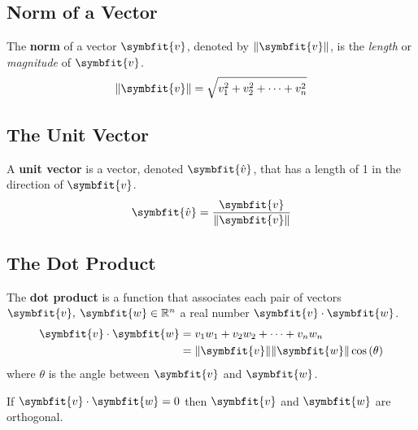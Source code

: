 \documentclass{article}
\begin{document}
\subsection{Norm of a Vector}
\begin{definition}
    The \textbf{norm} of a vector \(\symbfit{v}\), denoted by
    \(\norm{\symbfit{v}}\), is the \textit{length} or \textit{magnitude}
    of \(\symbfit{v}\).
    \begin{equation*}
        \norm{\symbfit{v}} = \sqrt{v_1^2 + v_2^2+\cdots+v_n^2}
    \end{equation*}
\end{definition}
\subsection{The Unit Vector}
\begin{definition}
    A \textbf{unit vector} is a vector, denoted \(\symbfit{\hat{v}}\),
    that has a length of 1 in the direction of \(\symbfit{v}\).
    \begin{equation*}
        \symbfit{\hat{v}} = \frac{\symbfit{v}}{\norm{\symbfit{v}}}
    \end{equation*}
\end{definition}
\subsection{The Dot Product}
\begin{definition}
    The \textbf{dot product} is a function that associates each pair of
    vectors \(\symbfit{v},\: \symbfit{w} \in \mathbb{R}^n\) a real
    number \(\symbfit{v}\cdot\symbfit{w}\).
    \begin{align*}
        \symbfit{v}\cdot\symbfit{w} & = v_1 w_1 + v_2 w_2 + \cdots + v_n w_n                            \\
                                    & = \norm{\symbfit{v}} \norm{\symbfit{w}} \cos{\left(\theta\right)}
    \end{align*}
    where \(\theta\) is the angle between \(\symbfit{v}\) and
    \(\symbfit{w}\).
\end{definition}
\begin{theorem}
    If \(\symbfit{v} \cdot \symbfit{w}=0\) then \(\symbfit{v}\) and
    \(\symbfit{w}\) are orthogonal.
\end{theorem}
\end{document}
